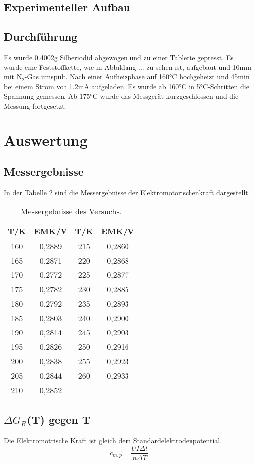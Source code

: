 \documentclass[12pt,a4paper,titlepage,headinclude,bibtotoc]{scrartcl}
\begin{document}
\subsection{Experimenteller Aufbau}

\subsection{Durchführung}
Es wurde 0.4002\;g Silberiodid abgewogen und zu einer Tablette gepresst. Es wurde eine Feststoffkette, wie in Abbildung ... zu sehen ist, aufgebaut und 10\;min mit $\text{N}_2$-Gas umspült. Nach einer Aufheizphase auf 160\;°C hochgeheizt und 45\;min bei einem Strom von 1.2\;mA aufgeladen. Es wurde ab 160\;°C in 5\;°C-Schritten die Spannung gemessen. Ab 175\;°C wurde das Messgerät kurzgeschlossen und die Messung fortgesetzt. 
\section{Auswertung}
\subsection{Messergebnisse}
In der Tabelle 2 sind die Messergebnisse der Elektromotorischenkraft dargestellt.
\begin{table}[h!]
\centering
\caption{Messergebnisse des Versuchs.}
\begin{tabular}{c|c||c|c}
T/\;K & EMK/\;V &T/\;K & EMK/\;V\\ 
\hline
160 & 0,2889 &   215&0,2860\\ 
165 & 0,2871& 220&0,2868 \\
170 & 0,2772 &  225&0,2877\\
175 & 0,2782& 230& 0,2885\\
180 &0,2792&235 &0,2893\\
185& 0,2803 &240&0,2900\\
190 &0,2814&245 &0,2903\\
195 &0,2826&250&0,2916\\
200 &0,2838&255 & 0,2923\\
205 & 0,2844&260& 0,2933\\
210& 0,2852&&\\
\end{tabular} 
\end{table}
\FloatBarrier
\subsection{$\Delta G_R$(T) gegen T}
Die Elektromotrische Kraft ist gleich dem Standardelektrodenpotential. 
\begin{equation}
c_{m,p} = \frac{UI\Delta t}{n\Delta T}
\end{equation}
\end{document}
